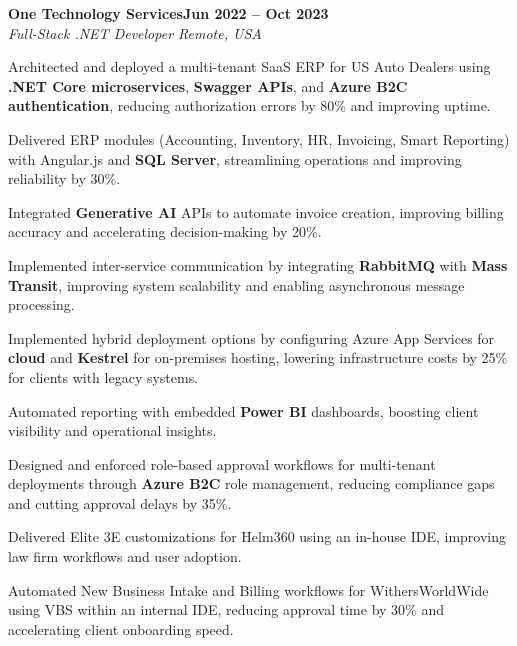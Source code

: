 \documentclass[letterpaper,10pt]{article}
\newcommand{\headingBf}[2]{
  \hspace{10pt}\textbf{#1}\hfill\textbf{#2}\\
}
\newcommand{\headingIt}[2]{
  \hspace{10pt}\textit{#1}\hfill\textit{#2}\\
}
\newenvironment{resume_list}{
  \vspace{-7pt}
  \begin{itemize}[itemsep=-2px, parsep=1pt, leftmargin=30pt]
}{
  \end{itemize}
}
\begin{document}
\headingBf{One Technology Services}{Jun 2022 -- Oct 2023}
\headingIt{Full-Stack .NET Developer \hfill Remote, USA}{}
\begin{resume_list}
    \item Architected and deployed a multi-tenant SaaS ERP for US Auto Dealers using \textbf{.NET Core microservices}, \textbf{Swagger APIs}, and \textbf{Azure B2C authentication}, reducing authorization errors by 80\% and improving uptime.
    \item Delivered ERP modules (Accounting, Inventory, HR, Invoicing, Smart Reporting) with Angular.js and \textbf{SQL Server}, streamlining operations and improving reliability by 30\%.
    \item Integrated \textbf{Generative AI} APIs to automate invoice creation, improving billing accuracy and accelerating decision-making by 20\%.
    \item Implemented inter-service communication by integrating \textbf{RabbitMQ} with \textbf{Mass Transit}, improving system scalability and enabling asynchronous message processing.
    \item Implemented hybrid deployment options by configuring Azure App Services for \textbf{cloud} and \textbf{Kestrel} for on-premises hosting, lowering infrastructure costs by 25\% for clients with legacy systems.
    \item Automated reporting with embedded \textbf{Power BI} dashboards, boosting client visibility and operational insights.   
    \item Designed and enforced role-based approval workflows for multi-tenant deployments through \textbf{Azure B2C} role management, reducing compliance gaps and cutting approval delays by 35\%.
    \item Delivered Elite 3E customizations for Helm360 using an in-house IDE, improving law firm workflows and user adoption.
    \item Automated New Business Intake and Billing workflows for WithersWorldWide using VBS within an internal IDE, reducing approval time by 30\% and accelerating client onboarding speed.
\end{resume_list}
\end{document}
